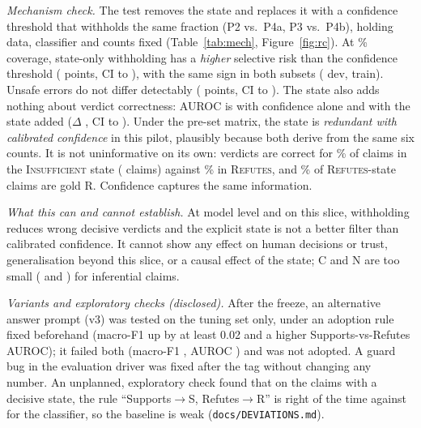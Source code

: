 \documentclass[acmlarge]{acmart}
\newcommand{\evs}[1]{\textsc{#1}}
\newcommand{\runin}[1]{\par\addvspace{4pt}\noindent\hspace{\parindent}\textit{#1}\hspace{0.45em}\ignorespaces}
\begin{document}
\runin{Mechanism check.} The test removes the state and replaces it with a confidence threshold that withholds the same fraction (P2 vs.\ P4a, P3 vs.\ P4b), holding data, classifier and counts fixed (Table~\ref{tab:mech}, Figure~\ref{fig:rc}). At \covPTwo\% coverage, state-only withholding has a \emph{higher} selective risk than the confidence threshold (\dRiskTwoFourA{} points, CI \dRiskTwoFourALo{} to \dRiskTwoFourAHi{}), with the same sign in both subsets (\dRiskTwoFourADev{} dev, \dRiskTwoFourATrain{} train). Unsafe errors do not differ detectably (\dUnsafeTwoFourA{} points, CI \dUnsafeTwoFourALo{} to \dUnsafeTwoFourAHi{}). The state also adds nothing about verdict correctness: AUROC is \aurocConf{} with confidence alone and \aurocConfState{} with the state added ($\Delta$ \dAuroc{}, CI \dAurocLo{} to \dAurocHi{}). Under the pre-set matrix, the state is \emph{redundant with calibrated confidence} in this pilot, plausibly because both derive from the same six counts. It is not uninformative on its own: verdicts are correct for \stateAccIns\% of claims in the \evs{Insufficient} state (\stateNIns{} claims) against \stateAccRef\% in \evs{Refutes}, and \% of \evs{Refutes}-state claims are gold R. Confidence captures the same information.

\begin{table}[t]
  \centering\small
  \caption{Mechanism check and baseline comparison: differences in percentage points (pooled).}
  \label{tab:mech}
  
\end{table}

\runin{What this can and cannot establish.} At model level and on this slice, withholding reduces wrong decisive verdicts and the explicit state is not a better filter than calibrated confidence. It cannot show any effect on human decisions or trust, generalisation beyond this slice, or a causal effect of the state; C and N are too small (\nPoolC{} and \nPoolN{}) for inferential claims.

\runin{Variants and exploratory checks (disclosed).} After the freeze, an alternative answer prompt (v3) was tested on the tuning set only, under an adoption rule fixed beforehand (macro-F1 up by at least 0.02 and a higher Supports-vs-Refutes AUROC); it failed both (macro-F1 \vThreeDF{}, AUROC \vThreeDAUROC{}) and was not adopted. A guard bug in the evaluation driver was fixed after the tag without changing any number. An unplanned, exploratory check found that on the \postN{} claims with a decisive state, the rule ``Supports$\to$S, Refutes$\to$R'' is right \postRuleAcc{} of the time against \postClfAcc{} for the classifier, so the baseline is weak (\texttt{docs/DEVIATIONS.md}).
\end{document}
